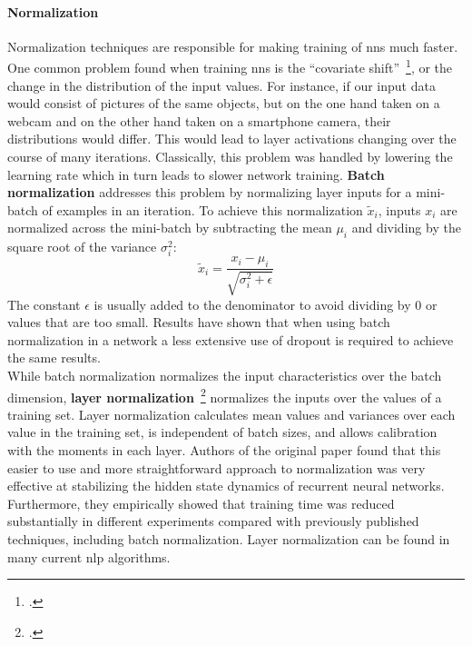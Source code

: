 \paragraph{Normalization}
Normalization techniques are responsible for making training of \gls{nn}s much faster. One common problem found when training \gls{nn}s is the ``covariate shift''~\footcite[1]{DBLP:journals/corr/IoffeS15}, or the change in the distribution of the input values. For instance, if our input data would consist of pictures of the same objects, but on the one hand taken on a webcam and on the other hand taken on a smartphone camera, their distributions would differ. This would lead to layer activations changing over the course of many iterations. Classically, this problem was handled by lowering the learning rate which in turn leads to slower network training. \textbf{Batch normalization} addresses this problem by normalizing layer inputs for a mini-batch of examples in an iteration. To achieve this normalization $ \widetilde{x}_i $, inputs $ x_i $ are normalized across the mini-batch by subtracting the mean $ \mu_i $ and dividing by the square root of the variance $ \sigma_i^2 $:
\begin{equation}
	\widetilde{x}_i = \frac{x_i - \mu_i}{\sqrt{\sigma_i^2 + \epsilon}}
\end{equation}
The constant $ \epsilon $ is usually added to the denominator to avoid dividing by $ 0 $ or values that are too small. Results have shown that when using batch normalization in a network a less extensive use of dropout is required to achieve the same results. \\
While batch normalization normalizes the input characteristics over the batch dimension, \textbf{layer normalization}~\footcite{ba2016layer} normalizes the inputs over the values of a training set. Layer normalization calculates mean values and variances over each value in the training set, is independent of batch sizes, and allows calibration with the moments in each layer. Authors of the original paper found that this easier to use and more straightforward approach to normalization was very effective at stabilizing the hidden state dynamics of recurrent neural networks. Furthermore, they empirically showed that training time was reduced substantially in different experiments compared with previously published techniques, including batch normalization. Layer normalization can be found in many current \gls{nlp} algorithms.

